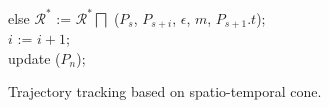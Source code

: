 \begin{figure}[tb!]
\begin{center}
{\begin{minipage}{3.3in}
{						\icc \>\hspace{3ex} else $\mathcal{R}^*$ := $\mathcal{R}^*\bigsqcap$ ($P_s$, $P_{s+i}$, $\epsilon$, $m$, $P_{s+1}.t$); \\
						\icc \>\hspace{3ex} $i$ := $i +1$;	\\
						\icc \>\hspace{0ex} update ($P_{n}$); 
					}
					\vspace{-2ex}
					\myhrule
				\end{minipage}
			}
		\end{center}
		\vspace{-1ex}
		\caption{\small Trajectory tracking based on spatio-temporal cone.}
		\label{alg:citt-s-half}
		\vspace{-1ex}
	\end{figure}

